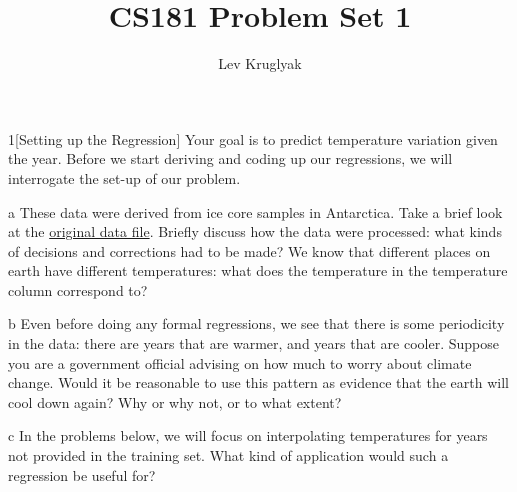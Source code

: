 \documentclass[expanded]{pset}
\title{CS181 Problem Set 1}
\author{Lev Kruglyak}
\begin{document}
\maketitle

\begin{problem}{1}[Setting up the Regression]
  Your goal is to predict temperature variation given the year.  Before we start deriving and coding up our regressions, we will interrogate the set-up of our problem.  
\end{problem}

\begin{parts}
  \begin{part}{a}
    These data were derived from ice core samples in Antarctica.
    Take a brief look at the
    \href{https://www.ncei.noaa.gov/pub/data/paleo/icecore/antarctica/epica_domec/edc3deuttemp2007.txt}{original
      data file}. Briefly discuss how the data were processed: what kinds of
    decisions and corrections had to be made?  We know that different
    places on earth have different temperatures: what does the
    temperature in the temperature column correspond to?
  \end{part}
        
  \begin{part}{b}
    Even before doing any formal regressions, we see that there is
    some periodicity in the data: there are years that are warmer, and
    years that are cooler.  Suppose you are a government official
    advising on how much to worry about climate change.  Would it be
    reasonable to use this pattern as evidence that the earth will
    cool down again?  Why or why not, or to what extent?
  \end{part}


  \begin{part}{c}
    In the problems below, we will focus on interpolating
    temperatures for years not provided in the training set.  What
    kind of application would such a regression be useful for?
  \end{part}
\end{parts}
\end{document}
